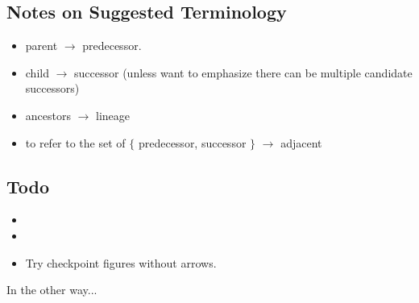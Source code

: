 \subsection{Notes on Suggested Terminology}
\begin{itemize}
\item parent $\rightarrow$ predecessor.
\item child $\rightarrow$ successor (unless want to emphasize there can be multiple candidate successors)
\item ancestors $\rightarrow$ lineage
\item to refer to the set of $\{$ predecessor, successor $\}$ $\rightarrow$ adjacent
\end{itemize}


\subsection{Todo}
\begin{itemize}
\item {}
\item {}
\item Try checkpoint figures without arrows.
\end{itemize}


In the other way...

